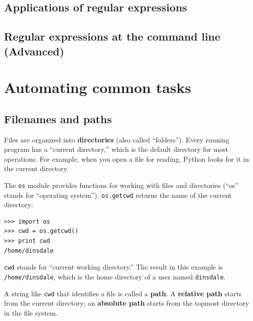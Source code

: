 \documentclass[10pt]{book}
\begin{document}
\section{Applications of regular expressions}

\section{Regular expressions at the command line (Advanced)}


\chapter{Automating common tasks}


\section{Filenames and paths}
\label{paths}


Files are organized into {\bf directories} (also called ``folders'').
Every running program has a ``current directory,'' which is the
default directory for most operations.  
For example, when you open a file for reading, Python looks for it in the
current directory.


The {\tt os} module provides functions for working with files and
directories (``os'' stands for ``operating system'').  {\tt os.getcwd}
returns the name of the current directory:


\beforeverb
\begin{verbatim}
>>> import os
>>> cwd = os.getcwd()
>>> print cwd
/home/dinsdale
\end{verbatim}
\afterverb
%
{\tt cwd} stands for ``current working directory.''  The result in
this example is {\tt /home/dinsdale}, which is the home directory of a
user named {\tt dinsdale}.


A string like {\tt cwd} that identifies a file is called a {\bf path}.
A {\bf relative path} starts from the current directory;
an {\bf absolute path} starts from the topmost directory in the
file system.

\end{document}
